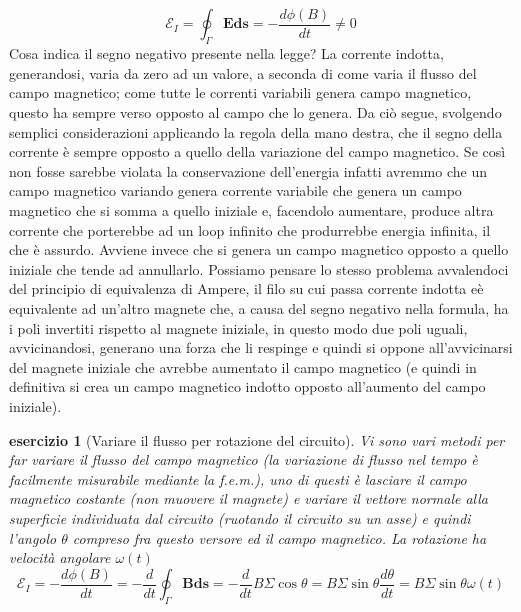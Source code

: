 \documentclass[10pt,a4paper]{article}
\newtheorem{esercizio}{esercizio}
\begin{document}
\[\mathcal{E}_I = \oint_{\Gamma}\mathbf{E}\mathbf{ds}=-\frac{d\phi(B)}{dt}\neq 0\]
Cosa indica il segno negativo presente nella legge? La corrente indotta, generandosi, varia da zero ad un valore, a seconda di come varia il flusso del campo magnetico; come tutte le correnti variabili genera campo magnetico, questo ha sempre verso opposto al campo che lo genera. Da ciò segue, svolgendo semplici considerazioni applicando la regola della mano destra, che il segno della corrente è sempre opposto a quello della variazione del campo magnetico.  Se così non fosse sarebbe violata la conservazione dell'energia infatti avremmo che un campo magnetico variando genera corrente variabile che genera un campo magnetico che si somma a quello iniziale e, facendolo aumentare, produce altra corrente che porterebbe ad un loop infinito che produrrebbe energia infinita, il che è assurdo. Avviene invece che si genera un campo magnetico opposto a quello iniziale che tende ad annullarlo. Possiamo pensare lo stesso problema avvalendoci del principio di equivalenza di Ampere, il filo su cui passa corrente indotta eè equivalente ad un'altro magnete che, a causa del segno negativo nella formula, ha i poli invertiti rispetto al magnete iniziale, in questo modo due poli uguali, avvicinandosi, generano una forza che li respinge e quindi si oppone all'avvicinarsi del magnete iniziale che avrebbe aumentato il campo magnetico  (e quindi in definitiva si crea un campo magnetico indotto opposto all'aumento del campo iniziale).
\begin{esercizio}[Variare il flusso per rotazione del circuito]
Vi sono vari metodi per far variare il flusso del campo magnetico (la variazione di flusso nel tempo è facilmente misurabile mediante la f.e.m.), uno di questi è lasciare il campo magnetico costante (non muovere il magnete) e variare il vettore normale alla superficie individuata dal circuito (ruotando il circuito su un asse) e quindi l'angolo $\theta$ compreso fra questo versore ed il campo magnetico. La rotazione ha velocità angolare $\omega(t)$
\[\mathcal{E}_I = -\frac{d\phi (B)}{dt} = -\frac{d}{dt}\oint_{\Gamma}\mathbf{B}\mathbf{ds} = -\frac{d}{dt}B\Sigma \cos\theta=B\Sigma \sin\theta\frac{d\theta}{dt}=B\Sigma\sin\theta\omega(t)\]
\end{esercizio}
\end{document}
